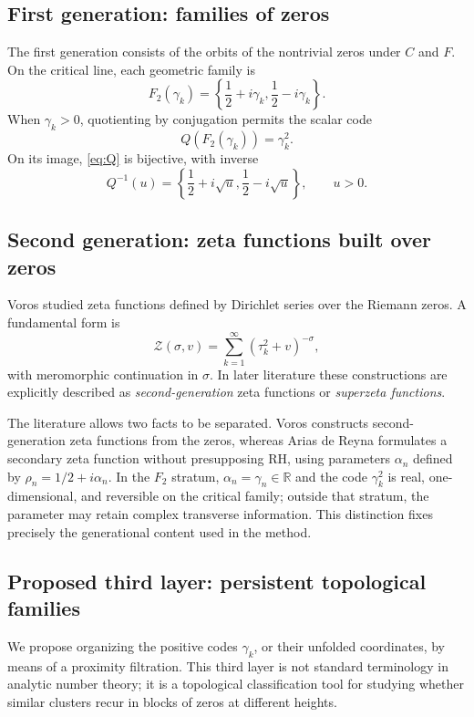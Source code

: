 \documentclass[11pt]{amsart}
\theoremstyle{definition}
\theoremstyle{remark}
\begin{document}
\subsection{First generation: families of zeros}
The first generation consists of the orbits of the nontrivial zeros under $C$ and $F$. On the critical line, each geometric family is
\begin{equation}
  F_2(\gamma_k)=\left\{\frac12+i\gamma_k,\frac12-i\gamma_k\right\}.
\end{equation}
When $\gamma_k>0$, quotienting by conjugation permits the scalar code
\begin{equation}\label{eq:Q}
 Q(F_2(\gamma_k))=\gamma_k^2.
\end{equation}
On its image, \eqref{eq:Q} is bijective, with inverse
\begin{equation}
 Q^{-1}(u)=\left\{\frac12+i\sqrt u,\frac12-i\sqrt u\right\},\qquad u>0.
\end{equation}

\subsection{Second generation: zeta functions built over zeros}
Voros studied zeta functions defined by Dirichlet series over the Riemann zeros. A fundamental form is
\begin{equation}\label{eq:superzeta}
 \mathcal Z(\sigma,v)=\sum_{k=1}^{\infty}(\tau_k^2+v)^{-\sigma},
\end{equation}
with meromorphic continuation in $\sigma$. In later literature these constructions are explicitly described as \emph{second-generation} zeta functions or \emph{superzeta functions}.

The literature allows two facts to be separated. Voros constructs second-generation zeta functions from the zeros, whereas Arias de Reyna formulates a secondary zeta function without presupposing RH, using parameters $\alpha_n$ defined by $\rho_n=1/2+i\alpha_n$. In the $F_2$ stratum, $\alpha_n=\gamma_n\in\mathbb R$ and the code $\gamma_k^2$ is real, one-dimensional, and reversible on the critical family; outside that stratum, the parameter may retain complex transverse information. This distinction fixes precisely the generational content used in the method.

\subsection{Proposed third layer: persistent topological families}
We propose organizing the positive codes $\gamma_k$, or their unfolded coordinates, by means of a proximity filtration. This third layer is not standard terminology in analytic number theory; it is a topological classification tool for studying whether similar clusters recur in blocks of zeros at different heights.
\end{document}

